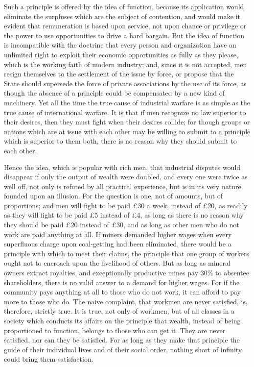 \documentclass{book}
\begin{document}
Such a principle is offered by the idea of function, because its application would eliminate the surpluses which are the subject of contention, and would make it evident that remuneration is based upon service, not upon chance or privilege or the power to use opportunities to drive a hard bargain. But the idea of function is incompatible with the doctrine that every person and organization have an unlimited right to exploit their economic opportunities as fully as they please, which is the working faith of modern industry; and, since it is not accepted, men resign themselves to the settlement of the issue by force, or propose that the State should supersede the force of private associations by the use of its force, as though the absence of a principle could be compensated by a new kind of machinery. Yet all the time the true cause of industrial warfare is as simple as the true cause of international warfare. It is that if men recognize no law superior to their desires, then they must fight when their desires collide; for though groups or nations which are at issue with each other may be willing to submit to a principle which is superior to them both, there is no reason why they should submit to each other.

Hence the idea, which is popular with rich men, that industrial disputes would disappear if only the output of wealth were doubled, and every one were twice as well off, not only is refuted by all practical experience, but is in its very nature founded upon an illusion. For the question is one, not of amounts, but of proportions; and men will fight to be paid £30 a week, instead of £20, as readily as they will fight to be paid £5 instead of £4, as long as there is no reason why they should be paid £20 instead of £30, and as long as other men who do not work are paid anything at all. If miners demanded higher wages when every superfluous charge upon coal-getting had been eliminated, there would be a principle with which to meet their claims, the principle that one group of workers ought not to encroach upon the livelihood of others. But as long as mineral owners extract royalties, and exceptionally productive mines pay 30\% to absentee shareholders, there is no valid answer to a demand for higher wages. For if the community pays anything at all to those who do not work, it can afford to pay more to those who do. The naive complaint, that workmen are never satisfied, is, therefore, strictly true. It is true, not only of workmen, but of all classes in a society which conducts its affairs on the principle that wealth, instead of being proportioned to function, belongs to those who can get it. They are never satisfied, nor can they be satisfied. For as long as they make that principle the guide of their individual lives and of their social order, nothing short of infinity could bring them satisfaction.
\end{document}
